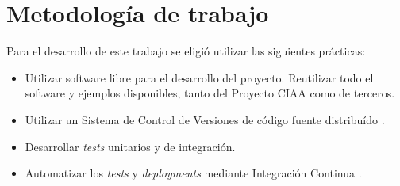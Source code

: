 \section{Metodología de trabajo}

Para el desarrollo de este trabajo se eligió utilizar las siguientes prácticas:

\begin{itemize}
    \item Utilizar software libre para el desarrollo del proyecto. Reutilizar todo el software y ejemplos disponibles, tanto del Proyecto CIAA como de terceros.
    \item Utilizar un Sistema de Control de Versiones de código fuente distribuído \citep{ControlVersionesGIT}.
    \item Desarrollar \textit{tests} unitarios y de integración.
    \item Automatizar los \textit{tests} y \textit{deployments} mediante Integración Continua \citep{IntegraciónContinuaGIT}.
\end{itemize}
